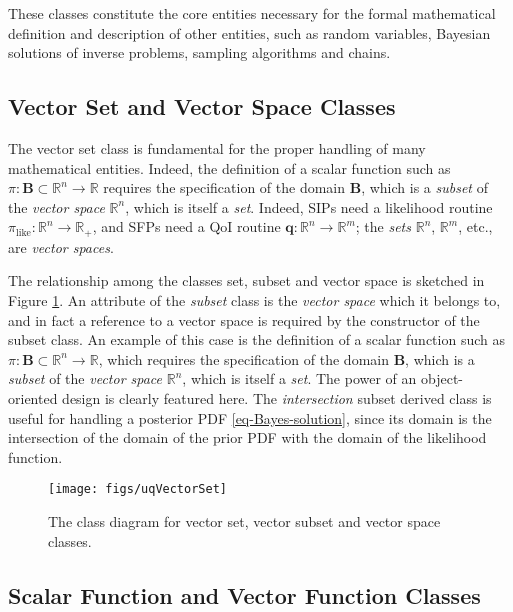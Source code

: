 These classes constitute the core entities necessary for the formal
mathematical definition and description of other entities, such as
random variables, Bayesian solutions of inverse problems, sampling algorithms and chains.



\subsection{Vector Set  and Vector Space Classes}\label{sec:vector-set-space}
%
The vector set class is fundamental for the proper handling of many mathematical entities.
Indeed, the definition of a scalar function such as $\pi:\mathbf{B}\subset\mathbb{R}^n\rightarrow\mathbb{R}$ requires the
specification of the domain $\mathbf{B}$, which is a {\it subset} of the {\it vector space} $\mathbb{R}^n$, which is itself a {\it set}. Indeed, 
 SIPs need a likelihood routine $\pi_{\text{like}}:\mathbb{R}^n\rightarrow\mathbb{R}_+$,
and SFPs need a QoI routine $\mathbf{q}:\mathbb{R}^n\rightarrow\mathbb{R}^m$; the \textit{sets} $\mathbb{R}^n$, $\mathbb{R}^m$, etc., are {\it vector spaces}.

The relationship among the classes set, subset and vector space is sketched in Figure \ref{fig-vector-space-subset-classes}.
%
An attribute of the {\it subset} class is the {\it vector space} which it belongs to, and in fact a reference to a vector space is required by the constructor of the subset class. An example of this case is the definition of a scalar function such as $\pi:\mathbf{B}\subset\mathbb{R}^n\rightarrow\mathbb{R}$, which requires the specification of the domain $\mathbf{B}$, which is a {\it subset} of the {\it vector space} $\mathbb{R}^n$, which is itself a {\it set}.
The power of an object-oriented design is clearly featured here.
The {\it intersection} subset derived class is useful for handling a posterior PDF \eqref{eq-Bayes-solution},
since its domain is the intersection of the domain of the prior PDF with the domain of the likelihood function.

\begin{figure}[hp]
\centering
\texttt{[image: figs/uqVectorSet]}
\vspace*{-8pt}
\caption{The class diagram for vector set, vector subset and vector space classes.}
\label{fig-vector-space-subset-classes}
\end{figure}

\subsection{Scalar Function and Vector Function Classes}\label{sec:scalar-vector-function}

